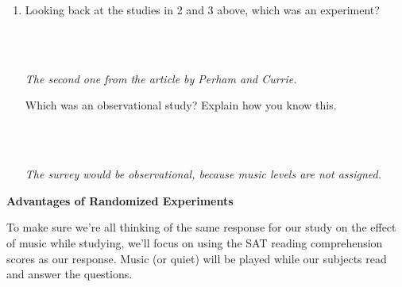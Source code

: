 \begin{enumerate}
\item  Looking back at  the studies in 2 and 3 above, which was an experiment?
\begin{students}
        \vspace{1cm}\\
\end{students}
\begin{key}
  \\ {\it  The second one from the article by Perham and Currie.}\\
\end{key}
  Which was an observational study?  Explain how you know this.
\begin{students}
        \vspace{1cm}\\
\end{students}
\begin{key}
  \\ {\it  The survey would be observational, because music levels are
    not assigned.}
\end{key}

\end{enumerate}


\begin{center}
  {\bf Advantages of Randomized Experiments}
\end{center}

To make sure we're all thinking of the same response for our study on
the effect of music while studying, we'll focus on using the SAT
reading comprehension scores as our response.  Music (or quiet) will
be played while our subjects read and answer the questions.

